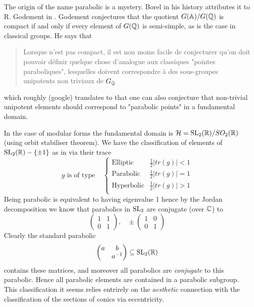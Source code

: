 \begin{Remark}
    The origin of the name parabolic is a mystery. Borel in his history \cite[VI.\S 2]{EssaysHistoryLie} attributes it to R. Godement in \cite{godementGroupesLineairesAlgebriques}. Godement conjectures that the quotient \(G(\A) / G(\Q)\) is compact if and only if every element of \(G(\Q)\) is semi-simple, as is the case in classical groups.  He says that 
    \begin{quote}
        Lorsque n'est pas compact, il est non moins facile de conjecturer qu’on doit pouvoir définir quelque chose d’analogue aux classiques "pointes paraboliques", lesquelles doivent correspondre à des  sous-groupes unipotents non triviaux de \(G_\Q\)
    \end{quote}
    which roughly (google) translates to that one can also conjecture that non-trivial unipotent elements should correspond to "parabolic points" in a fundamental domain.

    In the case of modular forms the fundamental domain is \(\mathcal{H} = \SL_2(\R)/SO_2(\R)\) (using orbit stabiliser theorem). We have the classification of elements of  \(\SL_2(\R) -\{\pm 1\}\) as in \cite[3.5]{borelAutomorphicFormsSL21997} via their trace
    \[g\text{ is of type } \;\;\; 
    \begin{cases}
        \text{Elliptic } & \frac{1}{2}|tr(g)| < 1 \\
        \text{Parabolic } & \frac{1}{2}|tr(g)| = 1 \\
        \text{Hyperbolic} & \frac{1}{2}|tr(g)| > 1 \\
    \end{cases}
    \]
    Being parabolic is equivalent to having eigenvalue 1 hence by the Jordan decomposition we know that parabolics in \(\operatorname{SL}_2\) are conjugate (over \(\C\)) to 
    \[\begin{pmatrix}
        1 & 1\\
        0 & 1
    \end{pmatrix},\;\;\; \pm\begin{pmatrix}
        1 & 0\\
        0 & 1
    \end{pmatrix}\]
    Clearly the standard parabolic 
    \[\begin{pmatrix}
        a & b \\
         & a\inv
    \end{pmatrix} \subseteq \SL_2(\R)\]
    contains these matrices, and moreover all parabolics are \textit{conjugate} to this parabolic. Hence all parabolic elements are contained in a parabolic subgroup. This classification it seems relies entrirely on the \textit{aesthetic} connection with the classification of the sections of conics via eccentricity.


\end{Remark}
